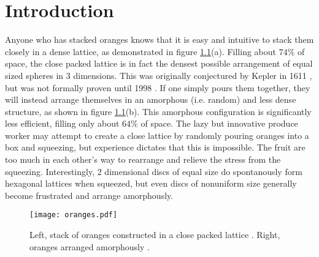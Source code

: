 \chapter{Introduction}


Anyone who has stacked oranges knows that it is easy and intuitive to stack them closely in a dense lattice, as demonstrated in figure \ref{plot:oranges}(a). Filling about $74\%$ of space, the close packed lattice is in fact the densest possible arrangement of equal sized spheres in 3 dimensions. This was originally conjectured by Kepler in 1611 \cite{kepler_strena_1611}, but was not formally proven until 1998 \cite{hales_overview_1998}. If one simply pours them together, they will instead arrange themselves in an amorphous (i.e. random) and less dense structure, as shown in figure \ref{plot:oranges}(b). This amorphous configuration is significantly less efficient, filling only about $64\%$ of space. The lazy but innovative produce worker may attempt to create a close lattice by randomly pouring oranges into a box and squeezing, but experience dictates that this is impossible. The fruit are too much in each other's way to rearrange and relieve the stress from the squeezing. Interestingly, 2 dimensional discs of equal size do spontanously form hexagonal lattices when squeezed, but even discs of nonuniform size generally become frustrated and arrange amorphously.

\begin{figure}[b!]

\texttt{[image: oranges.pdf]}

\caption[Left, stack of oranges constructed in a close packed lattice \cite{louw_soul_1967}. Right, oranges arranged amorphously \cite{gunter_photo_2021}.]{Left, stack of oranges constructed in a close packed lattice \cite{louw_soul_1967}. Right, oranges arranged amorphously \cite{gunter_photo_2021}.}

\label{plot:oranges}
\end{figure}


